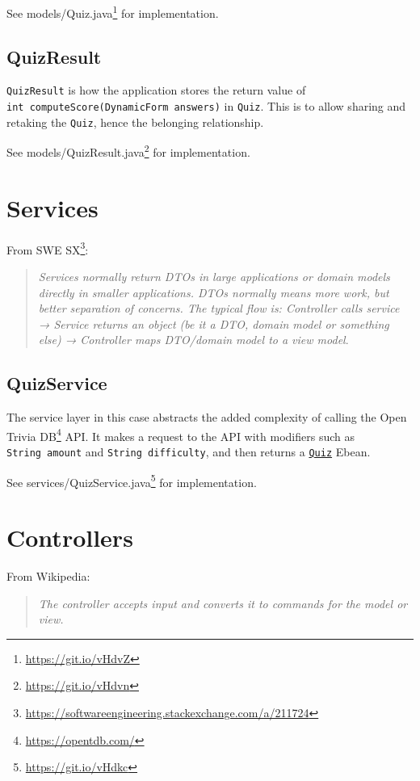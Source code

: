 \documentclass[english,a4paper,]{report}
\renewcommand{\href}[2]{#2\footnote{\url{#1}}}
\begin{document}
See \href{https://git.io/vHdvZ}{models/Quiz.java} for implementation.

\subsection{QuizResult}\label{quizresult}

\texttt{QuizResult} is how the application stores the return value of
\texttt{int\ computeScore(DynamicForm\ answers)} in \texttt{Quiz}. This
is to allow sharing and retaking the \texttt{Quiz}, hence the belonging
relationship.

See \href{https://git.io/vHdvn}{models/QuizResult.java} for
implementation.

\section{Services}\label{services}

From \href{https://softwareengineering.stackexchange.com/a/211724}{SWE
SX}:

\begin{quote}
\emph{Services normally return DTOs in large applications or domain
models directly in smaller applications. DTOs normally means more work,
but better separation of concerns. The typical flow is: Controller calls
service → Service returns an object (be it a DTO, domain model or
something else) → Controller maps DTO/domain model to a view model}.
\end{quote}

\subsection{QuizService}\label{quizservice}

The service layer in this case abstracts the added complexity of calling
the \href{https://opentdb.com/}{Open Trivia DB} API. It makes a request
to the API with modifiers such as \texttt{String\ amount} and
\texttt{String\ difficulty}, and then returns a
\protect\hyperlink{quiz}{\texttt{Quiz}} Ebean.

See \href{https://git.io/vHdkc}{services/QuizService.java} for
implementation.

\section{Controllers}\label{controllers}

From Wikipedia:

\begin{quote}
\emph{The controller accepts input and converts it to commands for the
model or view.}
\end{quote}
\end{document}
